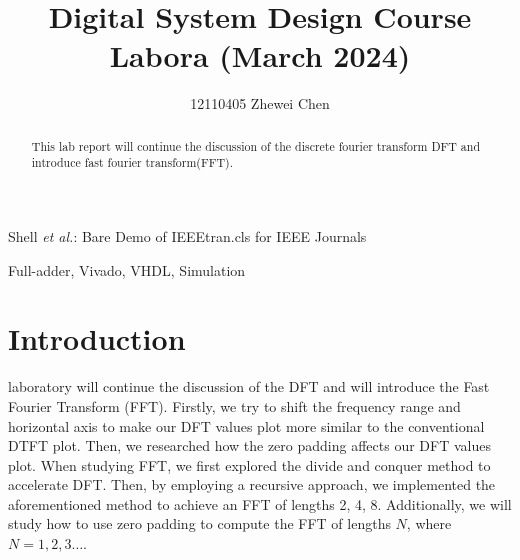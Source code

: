\documentclass[journal]{IEEEtran}
\begin{document}
\title{\color[rgb]{0,0.6,1}Digital System Design Course Labora (March 2024)}

\author{12110405   Zhewei Chen}

{Shell \MakeLowercase{\textit{et al.}}: Bare Demo of IEEEtran.cls for IEEE Journals}
\maketitle

\begin{abstract}
This lab report will continue the discussion of the discrete fourier transform DFT and introduce fast fourier transform(FFT). 
\end{abstract}

\begin{IEEEkeywords}
   Full-adder, Vivado, VHDL, Simulation
\end{IEEEkeywords}


\IEEEpeerreviewmaketitle



\section{Introduction}
 laboratory will continue the discussion of the DFT and will introduce the Fast Fourier Transform (FFT). Firstly, we try to shift the frequency range and horizontal axis to make our DFT values plot more similar to the conventional DTFT plot. Then, we researched how the zero padding affects our DFT values plot. When studying FFT, we first explored the divide and conquer method to accelerate DFT. Then, by employing a recursive approach, we implemented the aforementioned method to achieve an FFT of lengths 2, 4, 8.
Additionally, we will study how to use zero padding to compute the FFT of lengths $N$, where $N=1,2,3\dots$.
\end{document}
